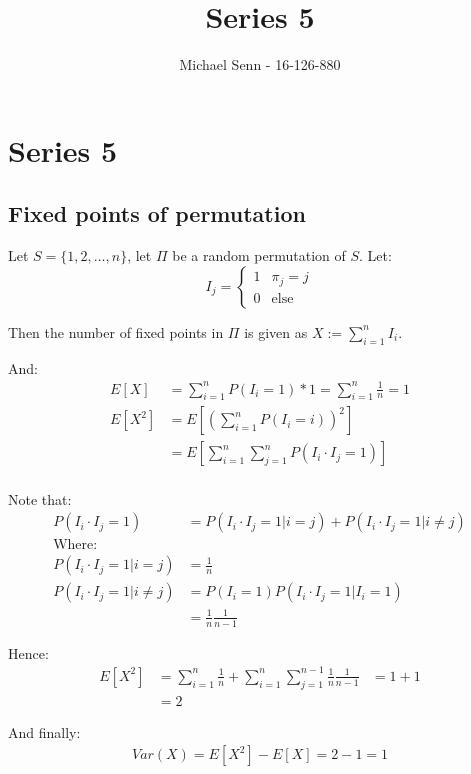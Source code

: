 \documentclass[a4paper]{scrreprt}
\title{Series 5}
\author{Michael Senn \maillink{michael.senn@students.unibe.ch} - 16-126-880}
\date{\printdate}
\begin{document}
\maketitle


\setcounter{chapter}{4}
\chapter{Series 5}

\section{Fixed points of permutation}

Let $S = \{1, 2, \ldots, n\}$, let $\Pi$ be a random permutation of $S$.
Let:
\[
	I_{j} =
	\begin{cases}
		1 & \pi_j = j \\
		0 & \text{else}
	\end{cases}
\]

Then the number of fixed points in $\Pi$ is given as $X := \sum_{i=1}^n{I_i}$.

And:
\begin{align*}
	E[X] & = \sum_{i=1}^n{P(I_i = 1) * 1} = \sum_{i=1}^n{\frac{1}{n}} = 1 \\
	E[X^2] & = E\left[\left(\sum_{i=1}^n{P(I_i = i)}\right)^2\right] \\
	       & = E\left[\sum_{i=1}^n{\sum_{j=1}^n{P(I_i \cdot I_j = 1)}}\right] \\
\end{align*}

Note that:
\begin{align*}
	P(I_i \cdot I_j = 1) & = P(I_i \cdot I_j = 1 | i = j) + P(I_i \cdot I_j = 1 | i \neq j) \\
	\text{Where}: \\
	P(I_i \cdot I_j = 1 | i = j) & = \frac{1}{n} \\
	P(I_i \cdot I_j = 1 | i \neq j) & = P(I_i = 1) P(I_i \cdot I_j = 1 | I_i = 1) \\
					& = \frac{1}{n} \frac{1}{n-1}
\end{align*}

Hence:
\begin{align*}
	E[X^2] & = \sum_{i=1}^n{\frac{1}{n}} + \sum_{i=1}^n{\sum_{j=1}^{n-1}{\frac{1}{n} \frac{1}{n-1}}}
	& = 1 + 1 \\
	& = 2
\end{align*}

And finally:
\begin{align*}
	Var(X) = E[X^2] - E[X] = 2 - 1 = 1
\end{align*}
\end{document}
